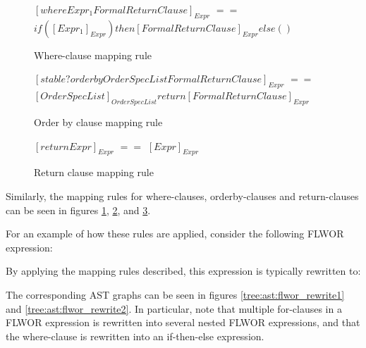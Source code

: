 \begin{figure}[!h]
\centering
$[where Expr_1 FormalReturnClause]_{Expr}$ \newline
$==$ \newline
$if ([Expr_1]_{Expr}) then [FormalReturnClause]_{Expr} else ()$
  \caption{Where-clause mapping rule}
  \label{figure:xquery:where_mapping_rule}
\end{figure}

\begin{figure}[!h]
\centering
$[stable? order by OrderSpecList FormalReturnClause]_{Expr}$ \newline
$==$ \newline
$[OrderSpecList]_{OrderSpecList} return [FormalReturnClause]_{Expr}$
  \caption{Order by clause mapping rule}
  \label{figure:xquery:orderby_mapping_rule}
\end{figure}

\begin{figure}[!h]
\centering
$[return Expr]_{Expr}$ \newline
$==$ \newline
$[Expr]_{Expr}$
  \caption{Return clause mapping rule}
  \label{figure:xquery:return_mapping_rule}
\end{figure}

Similarly, the mapping rules for where-clauses, orderby-clauses and
return-clauses can be seen in figures \ref{figure:xquery:where_mapping_rule},
\ref{figure:xquery:orderby_mapping_rule},
and \ref{figure:xquery:return_mapping_rule}.

For an example of how these rules are applied, consider the following FLWOR
expression:


By applying the mapping rules described,  this expression is typically
rewritten to:


The corresponding AST graphs can be seen in figures
\ref{tree:ast:flwor_rewrite1} and \ref{tree:ast:flwor_rewrite2}. In particular,
note that multiple for-clauses in a FLWOR expression is rewritten into several
nested FLWOR expressions, and that the where-clause is  rewritten into an
if-then-else expression. 


